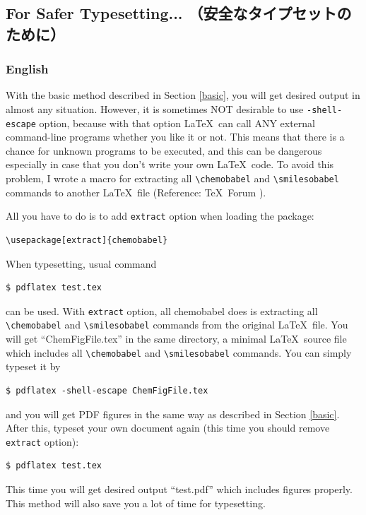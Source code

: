 \documentclass[12pt]{jsarticle}
\begin{document}
\clearpage

\subsection{For Safer Typesetting... （安全なタイプセットのために）} \label{extract}

\subsubsection{English}

With the basic method described in Section \ref{basic}, you will get desired output in almost any situation.
However, it is sometimes NOT desirable to use \verb|-shell-escape| option,
because with that option \LaTeX\ can call ANY external command-line programs whether you like it or not.
This means that there is a chance for unknown programs to be executed,
and this can be dangerous especially in case that you don't write your own \LaTeX\ code.
To avoid this problem, I wrote a macro for extracting all \verb|\chemobabel| and \verb|\smilesobabel| commands to another \LaTeX\ file (Reference: \TeX\ Forum \cite{OKU}).

All you have to do is to add \verb|extract| option when loading the package:
\begin{verbatim}
\usepackage[extract]{chemobabel}
\end{verbatim}
When typesetting, usual command
\begin{verbatim}
$ pdflatex test.tex
\end{verbatim}
can be used. 
With \verb|extract| option, all \textsf{chemobabel} does is extracting all \verb|\chemobabel| and \verb|\smilesobabel| commands from the original \LaTeX\ file.
You will get ``ChemFigFile.tex'' in the same directory, a minimal \LaTeX\ source file which includes all \verb|\chemobabel| and \verb|\smilesobabel| commands.
You can simply typeset it by
\begin{verbatim}
$ pdflatex -shell-escape ChemFigFile.tex
\end{verbatim}
and you will get PDF figures in the same way as described in Section \ref{basic}.
After this, typeset your own document again (this time you should remove \verb|extract| option):
\begin{verbatim}
$ pdflatex test.tex
\end{verbatim}
This time you will get desired output ``test.pdf'' which includes figures properly.
This method will also save you a lot of time for typesetting.
\end{document}
